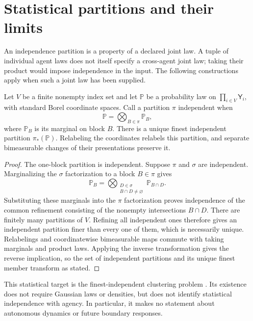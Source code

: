 \section{Statistical partitions and their limits}

An independence partition is a property of a declared joint law. A tuple
of individual agent laws does not itself specify a cross-agent joint
law; taking their product would impose independence in the input.
The following constructions apply when such a joint law has been supplied.

Let $V$ be a finite nonempty index set and let $\mathbb P$ be a
probability law on $\prod_{i\in V}\mathsf Y_i$, with standard Borel
coordinate spaces. Call a partition $\pi$ independent when
\begin{equation}
 \mathbb P=\bigotimes_{B\in\pi}\mathbb P_B,
 \label{inh:independent-partition}
\end{equation}
where $\mathbb P_B$ is its marginal on block $B$.
There is a unique finest independent partition $\pi_*(\mathbb P)$.
Relabeling the coordinates relabels this partition, and separate
bimeasurable changes of their presentations preserve it.
\begin{proof}
The one-block partition is independent. Suppose $\pi$ and $\sigma$
are independent. Marginalizing the $\sigma$ factorization to a block
$B\in\pi$ gives
\begin{equation}
 \mathbb P_B
 =\bigotimes_{\substack{D\in\sigma\\B\cap D\ne\varnothing}}
       \mathbb P_{B\cap D}.
\end{equation}
Substituting these marginals into the $\pi$ factorization proves
independence of the common refinement consisting of the nonempty
intersections $B\cap D$. There are finitely many partitions of $V$.
Refining all independent ones therefore gives an independent partition
finer than every one of them, which is necessarily unique.
Relabelings and coordinatewise bimeasurable maps commute with taking
marginals and product laws. Applying the inverse transformation gives
the reverse implication, so the set of independent partitions and its
unique finest member transform as stated.
\end{proof}

This statistical target is the finest-independent clustering problem
\citep{Ryabko2017}. Its existence does not require Gaussian laws or
densities, but does not identify statistical independence with agency.
In particular, it makes no statement about autonomous dynamics or
future boundary responses.


